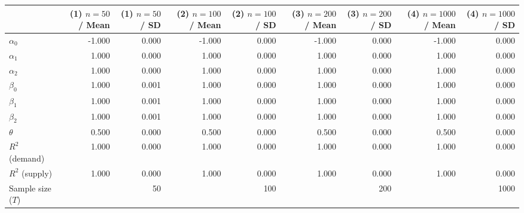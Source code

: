 
\begin{tabular}[t]{lrrrrrrrr}
\toprule
  & (1) $n=50$ / Mean & (1) $n=50$ / SD & (2) $n=100$ / Mean & (2) $n=100$ / SD & (3) $n=200$ / Mean & (3) $n=200$ / SD & (4) $n=1000$ / Mean & (4) $n=1000$ / SD\\
\midrule
$\alpha_{0}$ & -1.000 & 0.000 & -1.000 & 0.000 & -1.000 & 0.000 & -1.000 & 0.000\\
$\alpha_{1}$ & 1.000 & 0.000 & 1.000 & 0.000 & 1.000 & 0.000 & 1.000 & 0.000\\
$\alpha_{2}$ & 1.000 & 0.000 & 1.000 & 0.000 & 1.000 & 0.000 & 1.000 & 0.000\\
$\beta_{0}$ & 1.000 & 0.001 & 1.000 & 0.000 & 1.000 & 0.000 & 1.000 & 0.000\\
$\beta_{1}$ & 1.000 & 0.001 & 1.000 & 0.000 & 1.000 & 0.000 & 1.000 & 0.000\\
$\beta_{2}$ & 1.000 & 0.001 & 1.000 & 0.000 & 1.000 & 0.000 & 1.000 & 0.000\\
$\theta$ & 0.500 & 0.000 & 0.500 & 0.000 & 0.500 & 0.000 & 0.500 & 0.000\\
$R^{2}$ (demand) & 1.000 & 0.000 & 1.000 & 0.000 & 1.000 & 0.000 & 1.000 & 0.000\\
$R^{2}$ (supply) & 1.000 & 0.000 & 1.000 & 0.000 & 1.000 & 0.000 & 1.000 & 0.000\\
Sample size ($T$) &  & 50 &  & 100 &  & 200 &  & 1000\\
\bottomrule
\end{tabular}
